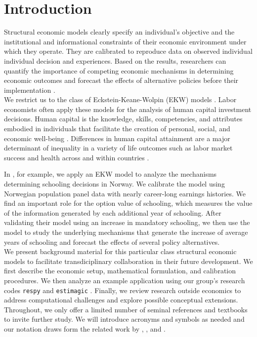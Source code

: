 \section{Introduction}
\noindent Structural economic models clearly specify an individual's objective and the institutional and informational constraints of their economic environment under which they operate. They are calibrated to reproduce data on observed individual individual decision and experiences. Based on the results, researchers can quantify the importance of competing economic mechanisms in determining economic outcomes and forecast the effects of alternative policies before their implementation \citep{Wolpin.2013}.\\

\noindent We restrict us to the class of Eckstein-Keane-Wolpin (EKW) models \citep{Adda.2017, Blundell.2016, Keane.1997}. Labor economists often apply these models for the analysis of human capital investment decisions. Human capital is the knowledge, skills, competencies, and attributes embodied in individuals that facilitate the creation of personal, social, and economic well-being \citep{Becker.1964}. Differences in human capital attainment are a major determinant of inequality in a variety of life outcomes such as labor market success and health across and within countries \citep{OECD.2001}.

In \citet{Bhuller.2018}, for example, we apply an EKW model to analyze the mechanisms determining schooling decisions in Norway. We calibrate the model using Norwegian population panel data with nearly career-long earnings histories. We find an important role for the option value of schooling, which measures the value of the information generated by each additional year of schooling. After validating their model using an increase in mandatory schooling, we then use the model to study the underlying mechanisms that generate the increase of average years of schooling and forecast the effects of several policy alternatives.\\

\noindent We present background material for this particular class structural economic models to facilitate transdiciplinary collaboration in their future development. We first describe the economic setup, mathematical formulation, and calibration procedures. We then analyze an example application using our group's research codes \verb+respy+  \citep{respy-1.0} and \verb+estimagic+ \citep{Gabler.2019}. Finally, we review research outside economics to address computational challenges and explore possible conceptual extensions.\\

\noindent Throughout, we only offer a limited number of seminal references and textbooks to invite further study. We will introduce acronyms and symbols as needed and our notation draws form the related work by \cite{Aguirregabiria.2010}, \cite{Arcidiacono.2011}, and \cite{Puterman.1994}.
